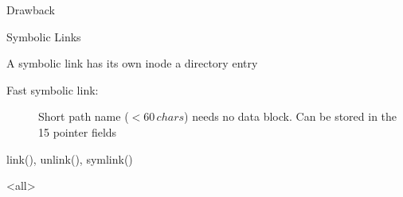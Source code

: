 \begin{frame}
  \begin{iblock}{Drawback}
    \begin{center}
    \end{center}
  \end{iblock}
\end{frame}

\begin{frame}{Symbolic Links}
  \begin{iblock}{A symbolic link has its own inode {\pright} a directory entry}
    \begin{center}
    \end{center}
  \end{iblock}
  \begin{description}
  \item[Fast symbolic link:] Short path name ($< 60\,chars$) needs no data block. Can be
    stored in the 15 pointer fields
  \end{description}
\end{frame}

\begin{frame}{\ttfamily link(), unlink(), symlink()}
  \begin{center}
  \end{center}
\end{frame}


\mode<all>
